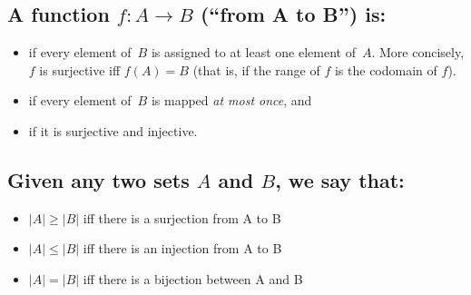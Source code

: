 \documentclass[twoside,11pt]{article}
\begin{document}

\subsection*{A function $f: A\rightarrow B$ (``from A to B'') is:}
\begin{itemize}
%

\item
{} if every element of~$B$ is assigned to at least one
element of~$A$. More concisely, $f$ is surjective iff $f(A) = B$ (that is, if the range of $f$ is the codomain of $f$).

\item
{} if every element of~$B$ is mapped \emph{at most once}, and

\item
{} if it is surjective and injective.
\end{itemize}

\subsection*{Given any two sets $A$ and $B$, we say that:}
\begin{itemize}
\item $|A| \geq |B|$ iff there is a surjection from A to B
\item $|A| \leq |B|$ iff there is an injection from A to B
\item $|A| = |B|$ iff there is a bijection between A and B

\end{itemize}
\end{document}

